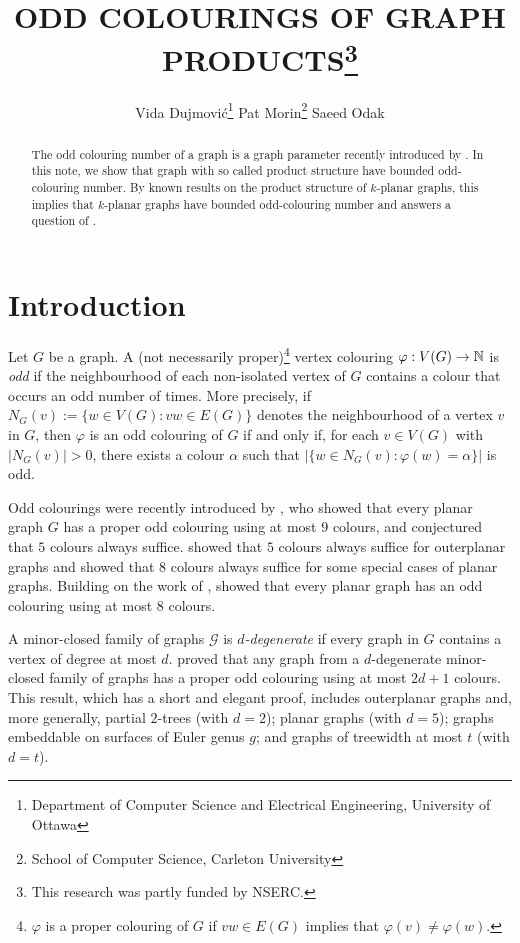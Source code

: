 \documentclass{patmorin}
\title{\MakeUppercase{Odd Colourings of Graph Products}\thanks{This research was partly funded by NSERC.}}
\author{%
  Vida Dujmović\thanks{Department of Computer Science and Electrical Engineering, University of Ottawa}\qquad
  Pat Morin\thanks{School of Computer Science, Carleton University}\qquad
  Saeed Odak\footnotemark[1]
}
\date{}
\begin{document}
\maketitle

\begin{abstract}
  The odd colouring number of a graph is a graph parameter recently introduced by \citet{petrusevski.skrekovski:colorings}.  In this note, we show that graph with so called product structure have bounded odd-colouring number. By known results on the product structure of $k$-planar graphs, this implies that $k$-planar graphs have bounded odd-colouring number and answers a question of \citet{cranston.lafferty.ea:note}.
\end{abstract}

%

\section{Introduction}

Let $G$ be a graph.  A (not necessarily proper)\footnote{$\varphi$ is a proper colouring of $G$ if $vw\in E(G)$ implies that $\varphi(v)\neq\varphi(w)$.} vertex colouring $\varphi:V(G)\to\mathbb{N}$ is \emph{odd} if the neighbourhood of each non-isolated vertex of $G$ contains a colour that occurs an odd number of times.  More precisely, if $N_G(v):=\{w\in V(G):vw\in E(G)\}$ denotes the neighbourhood of a vertex $v$ in $G$, then $\varphi$ is an odd colouring of $G$ if and only if, for each $v\in V(G)$ with $|N_G(v)|>0$, there exists a colour $\alpha$ such that $|\{w\in N_G(v): \varphi(w)=\alpha\}|$ is odd.

Odd colourings were recently introduced by \citet{petrusevski.skrekovski:colorings}, who showed that every planar graph $G$ has a proper odd colouring using at most $9$ colours, and conjectured that $5$ colours always suffice.  \citet{caro.petrusevski.ea:remarks} showed that $5$ colours always suffice for outerplanar graphs and showed that $8$ colours always suffice for some special cases of planar graphs.  Building on the work of \citet{caro.petrusevski.ea:remarks}, \citet{petr.portier:odd} showed that every planar graph has an odd colouring using at most $8$ colours.

A minor-closed family of graphs $\mathcal{G}$ is \emph{$d$-degenerate} if every graph in $G$ contains a vertex of degree at most $d$.
\citet{cranston.lafferty.ea:note} proved that any graph from a $d$-degenerate minor-closed family of graphs has a proper odd colouring using at most $2d+1$ colours.  This result, which has a short and elegant proof, includes outerplanar graphs and, more generally, partial $2$-trees (with $d=2$); planar graphs (with $d=5$); graphs embeddable on surfaces of Euler genus $g$; and graphs of treewidth at most $t$ (with $d=t$).
\end{document}
